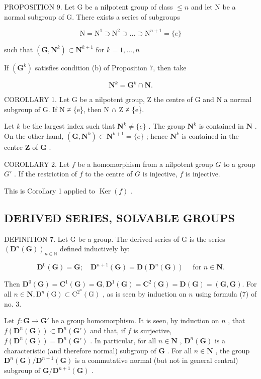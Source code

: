 PROPOSITION 9. Let G be a nilpotent group of class \(\leqslant n\) and let N be a normal subgroup of G. There exists a series of subgroups

\[
\mathrm{N} = \mathrm{N} ^ {1} \supset \mathrm{N} ^ {2} \supset \dots \supset \mathrm{N} ^ {n + 1} = \{e \}
\]

such that \((\mathbf{G},\mathbf{N}^k)\subset \mathbf{N}^{k + 1}\) for \(k = 1,\dots ,n\)

If \((\mathbf{G}^k)\) satisfies condition (b) of Proposition 7, then take

\[
\mathbf {N} ^ {k} = \mathbf {G} ^ {k} \cap \mathbf {N}.
\]

COROLLARY 1. Let G be a nilpotent group, Z the centre of G and N a normal subgroup of G. If N ≠ \{e\}, then N ∩ Z ≠ \{e\}.

Let \(k\) be the largest index such that \(\mathbf{N}^k \neq \{e\}\) . The group \(\mathbf{N}^k\) is contained in \(\mathbf{N}\) . On the other hand, \((\mathbf{G}, \mathbf{N}^k) \subset \mathbf{N}^{k+1} = \{e\}\) ; hence \(\mathbf{N}^k\) is contained in the centre \(\mathbf{Z}\) of \(\mathbf{G}\) .

COROLLARY 2. Let \(f\) be a homomorphism from a nilpotent group \(G\) to a group \(G'\) . If the restriction of \(f\) to the centre of \(G\) is injective, \(f\) is injective.

This is Corollary 1 applied to \(\operatorname{Ker}(f)\) .

\subsection{DERIVED SERIES, SOLVABLE GROUPS}

DEFINITION 7. Let G be a group. The derived series of G is the series \((\mathbf{D}^n (\mathbf{G}))_{n\in \mathbb{N}}\) defined inductively by:

\[
\mathbf {D} ^ {0} (\mathbf {G}) = \mathbf {G}; \quad \mathbf {D} ^ {n + 1} (\mathbf {G}) = \mathbf {D} (\mathbf {D} ^ {n} (\mathbf {G})) \quad \text { for } n \in \mathbf {N}.
\]

Then \(\mathbf{D}^0 (\mathbf{G}) = \mathbf{C}^1 (\mathbf{G}) = \mathbf{G},\mathbf{D}^1 (\mathbf{G}) = \mathbf{C}^2 (\mathbf{G}) = \mathbf{D}(\mathbf{G}) = (\mathbf{G},\mathbf{G}).\) For all \(n \in \mathbf{N}, \mathrm{D}^n(\mathrm{G}) \subset \mathrm{C}^{2^n}(\mathrm{G})\) , as is seen by induction on \(n\) using formula (7) of no. 3.

Let \(f: \mathbf{G} \to \mathbf{G}'\) be a group homomorphism. It is seen, by induction on \(n\) , that \(f(\mathbf{D}^n(\mathbf{G})) \subset \mathbf{D}^n(\mathbf{G}')\) and that, if \(f\) is surjective, \(f(\mathbf{D}^n(\mathbf{G})) = \mathbf{D}^n(\mathbf{G}')\) . In particular, for all \(n \in \mathbf{N}\) , \(\mathbf{D}^n(\mathbf{G})\) is a characteristic (and therefore normal) subgroup of \(\mathbf{G}\) . For all \(n \in \mathbf{N}\) , the group \(\mathbf{D}^n(\mathbf{G}) / \mathbf{D}^{n+1}(\mathbf{G})\) is a commutative normal (but not in general central) subgroup of \(\mathbf{G} / \mathbf{D}^{n+1}(\mathbf{G})\) .


